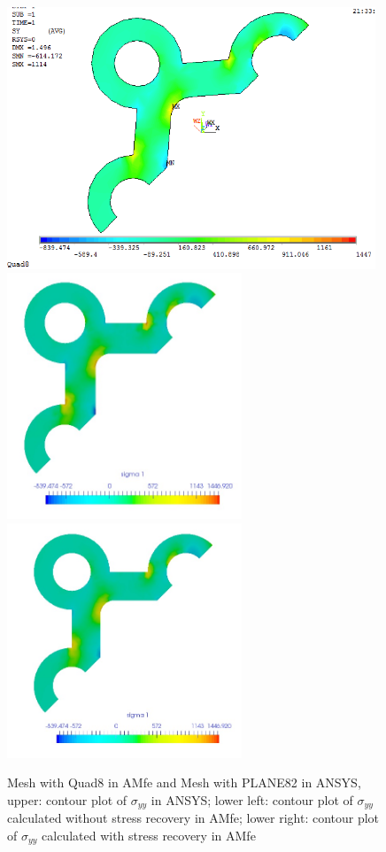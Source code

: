 \begin{figure}[htbp]
	\begin{center}
		\includegraphics[width=11cm,clip]{Quad8_Syy.png} 	
		\includegraphics[width=7cm,clip]{Quad8_Syy_PD.png} 		
		\includegraphics[width=7cm,clip]{Quad8_Syy_P.png} 		
		\caption{Mesh with Quad8 in AMfe and Mesh with PLANE82 in ANSYS, upper: contour plot of $\sigma_{yy}$ in ANSYS; lower left: contour plot of $\sigma_{yy}$ calculated without stress recovery in AMfe; lower right: contour plot of $\sigma_{yy}$ calculated with stress recovery in AMfe} \label{fig: Quad8_Syy}
	\end{center}
\end{figure}
\clearpage 

